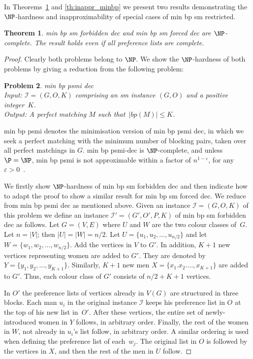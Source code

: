 \documentclass[preprint,12pt]{elsarticle}
\newtheorem{theorem}{Theorem}[section]
\newtheorem{pr}[theorem]{Problem}
\begin{document}
In Theorems~\ref{th:minbpsmforbidden} and \ref{th:inappr_minbp} we present two results demonstrating the $\NP$-hardness and inapproximability of special cases of {\sc min bp sm restricted}.

\begin{theorem}
	\label{th:minbpsmforbidden}
	{\sc min bp sm forbidden dec} and {\sc min bp sm forced dec} are $\NP$-complete.  The result holds even if all preference lists are complete.
\end{theorem}

\begin{proof}
Clearly both problems belong to $\NP$.  We show the $\NP$-hardness of both problems by giving a reduction from the following problem:

\begin{pr} {\sc min bp psmi dec}\ \\
	Input: $\mathcal{I} = (G, O, K)$ comprising an {\sc sm} instance $(G,O)$ and a positive integer~$K$. \\
	Output: A perfect matching $M$ such that~$|bp(M)| \leq K$.
\end{pr}

{\sc min bp psmi} denotes the minimisation version of {\sc min bp psmi dec}, in which we seek a perfect matching with the minimum number of blocking pairs, taken over all perfect matchings in $G$.  {\sc min bp psmi-dec} is $\NP$-complete, and unless $\P = \NP$, {\sc min bp psmi} is not approximable within a factor of $n^{1 - \varepsilon}$, for any~$\varepsilon > 0$~\cite{BMM10}.

We firstly show $\NP$-hardness of {\sc min bp sm forbidden dec} and then indicate how to adapt the proof to show a similar result for {\sc min bp sm forced dec}.  We reduce from {\sc min bp psmi dec} as mentioned above.  Given an instance $\mathcal{I} = (G, O, K)$ of this problem we define an instance $\mathcal{I'} = (G', O', P, K)$ of {\sc min bp sm forbidden dec} as follows.  Let $G=(V,E)$ where $U$ and $W$ are the two colour classes of~$G$.  Let $n=|V|$; then $|U|=|W|=n/2$.  Let $U=\{u_1,u_2,\dots,u_{n/2}\}$
and let $W=\{w_1,w_2,\dots,w_{n/2}\}$.  Add the vertices in $V$ to $G'$.
In addition, $K + 1$ new vertices representing women are added to $G'$. They are denoted by $Y=\{y_1,y_2,\dots,y_{K+1}\}$. Similarly, $K+1$ new men $X=\{x_1.x_2.\dots,x_{K+1}\}$ are added to $G'$. Thus, each colour class of $G'$ consists of $n/2 + K + 1$ vertices. 
	
In $O'$ the preference lists of vertices already in $V(G)$ are structured in three blocks. Each man $u_i$ in the original instance $\mathcal{I}$ keeps his preference list in $O$ at the top of his new list in~$O'$. After these vertices, the entire set of newly-introduced women in $Y$ follows, in arbitrary order. Finally, the rest of the women in $W$, not already in $u_i$'s list follow, in arbitrary order. A similar ordering is used when defining the preference list of each~$w_j$. The original list in $O$ is followed by the vertices in $X$, and then the rest of the men in $U$ follow.


\end{proof}
\end{document}
